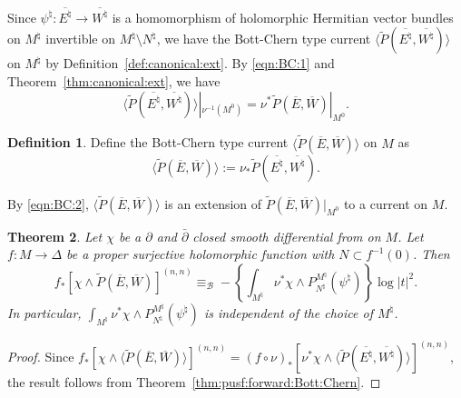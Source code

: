 \documentclass[amscd, leqno]{amsart}
\theoremstyle{plain}
\newtheorem{theorem}{Theorem}[section]
\theoremstyle{definition}
\newtheorem{definition}[theorem]{Definition}
\theoremstyle{remark}
\newenvironment{pf}{\begin{proof}}{\end{proof}}
\begin{document}
Since $\psi^{\natural} \colon \overline{E^{\natural}} \to \overline{W^{\natural}}$ is a homomorphism of 
holomorphic Hermitian vector bundles on $M^{\natural}$ invertible on $M^{\natural} \setminus N^{\natural}$, 
we have the Bott-Chern type current $\langle \widetilde{P}(\overline{E^{\natural}},\overline{W^{\natural}}) \rangle$ on $M^{\natural}$ 
by Definition~\ref{def:canonical:ext}.
By \eqref{eqn:BC:1} and Theorem~\ref{thm:canonical:ext}, we have
\begin{equation}
\label{eqn:BC:2}
\langle \widetilde{P}(\overline{E^{\natural}}, \overline{W^{\natural}}) \rangle |_{\nu^{-1}(M^{0})} 
= \nu^{*}\widetilde{P}(\overline{E}, \overline{W})|_{M^{0}}.
\end{equation}


\begin{definition}
\label{def:canonical:ext:2}
Define the Bott-Chern type current $ \langle \widetilde{P}(\overline{E}, \overline{W}) \rangle$ on $M$ as
$$
\langle \widetilde{P}(\overline{E}, \overline{W}) \rangle := \nu_{*}\widetilde{P}(\overline{E^{\natural}}, \overline{W^{\natural}}).
$$
\end{definition}


By \eqref{eqn:BC:2}, $\langle \widetilde{P}(\overline{E}, \overline{W}) \rangle$ is an extension of 
$\widetilde{P}(\overline{E}, \overline{W})|_{M^{0}}$ to a current on $M$.


\begin{theorem}
\label{thm:pusf:forward:Bott:Chern:2}
Let $\chi$ be a $\partial$ and $\bar{\partial}$ closed smooth differential from on $M$. 
Let $f \colon M \to \varDelta$ be a proper surjective holomorphic function with $N \subset f^{-1}(0)$. Then 
$$
f_{*}[\chi\wedge\widetilde{P}(\overline{E}, \overline{W})]^{(n,n)}
\equiv_{\mathcal B}
-\left\{ \int_{M^{\natural}} \nu^{*}\chi \wedge P^{M^{\natural}}_{N^{\natural}}(\psi^{\natural}) \right\} 
\log | t |^{2}.
$$
In particular, $\int_{M^{\natural}} \nu^{*}\chi \wedge P^{M^{\natural}}_{N^{\natural}}(\psi^{\natural})$ 
is independent of the choice of $M^{\natural}$.
\end{theorem}

\begin{pf}
Since 
$f_{*}[\chi\wedge \langle \widetilde{P}(\overline{E},\overline{W}) \rangle]^{(n,n)}=
(f\circ \nu)_{*} [ \nu^{*}\chi\wedge \langle \widetilde{P}(\overline{E^{\natural}},\overline{W^{\natural}}) \rangle ]^{(n,n)}$,
the result follows from Theorem~\ref{thm:pusf:forward:Bott:Chern}.
\end{pf}
\end{document}
